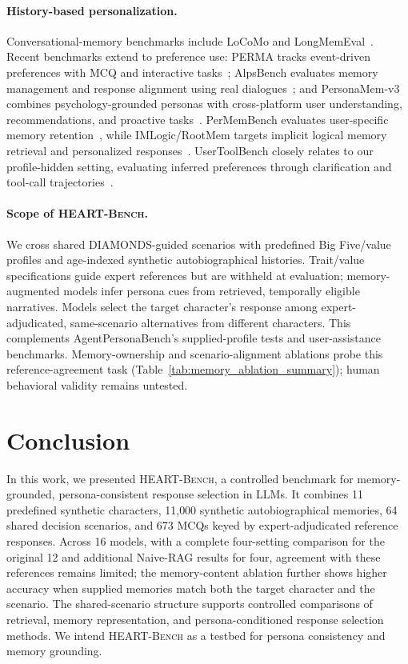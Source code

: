 \documentclass[11pt]{article}
\newcommand{\ourbench}[0]{\textsc{HEART-Bench}\xspace}
\begin{document}
\paragraph{History-based personalization.}
Conversational-memory benchmarks include LoCoMo and LongMemEval~\cite{maharana2024evaluating,wu2024longmemeval}. Recent benchmarks extend to preference use: PERMA tracks event-driven preferences with MCQ and interactive tasks~\cite{liu2026perma}; AlpsBench evaluates memory management and response alignment using real dialogues~\cite{xiao2026alpsbench}; and PersonaMem-v3 combines psychology-grounded personas with cross-platform user understanding, recommendations, and proactive tasks~\cite{jiang2026personamemv3}. PerMemBench evaluates user-specific memory retention~\cite{in2026personalizethenstore}, while IMLogic/RootMem targets implicit logical memory retrieval and personalized responses~\cite{ding2026rootmemories}. UserToolBench closely relates to our profile-hidden setting, evaluating inferred preferences through clarification and tool-call trajectories~\cite{yin2026usertoolbench}.

\paragraph{Scope of \ourbench.}
We cross shared DIAMONDS-guided scenarios with predefined Big Five/value profiles and age-indexed synthetic autobiographical histories. Trait/value specifications guide expert references but are withheld at evaluation; memory-augmented models infer persona cues from retrieved, temporally eligible narratives. Models select the target character's response among expert-adjudicated, same-scenario alternatives from different characters. This complements AgentPersonaBench's supplied-profile tests and user-assistance benchmarks. Memory-ownership and scenario-alignment ablations probe this reference-agreement task (Table~\ref{tab:memory_ablation_summary}); human behavioral validity remains untested.

\section{Conclusion}
In this work, we presented \ourbench, a controlled benchmark for memory-grounded, persona-consistent response selection in LLMs. It combines 11 predefined synthetic characters, 11{,}000 synthetic autobiographical memories, 64 shared decision scenarios, and 673 MCQs keyed by expert-adjudicated reference responses. Across 16 models, with a complete four-setting comparison for the original 12 and additional Naive-RAG results for four, agreement with these references remains limited; the memory-content ablation further shows higher accuracy when supplied memories match both the target character and the scenario. The shared-scenario structure supports controlled comparisons of retrieval, memory representation, and persona-conditioned response selection methods. We intend \ourbench as a testbed for persona consistency and memory grounding.
\end{document}
